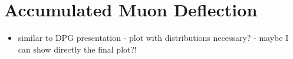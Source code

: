 \section{Accumulated Muon Deflection}\label{sec:accum_defl}
\begin{itemize}
    \item similar to DPG presentation - plot with distributions necessary? - 
        maybe I can show directly the final plot?!
\end{itemize}